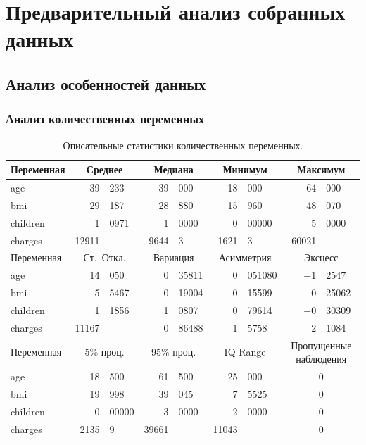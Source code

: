 \documentclass[a4paper,12pt]{article}
\begin{document}
\section{Предварительный анализ собранных данных}
\subsection{Анализ особенностей данных}
\subsubsection{Анализ количественных переменных}

\begin{table}[H]
	\begin{center}
		\begin{tabular}{|l|r@{,}l|r@{,}l|r@{,}l|r@{,}l|}
			\hline
			Переменная & \multicolumn{2}{c|}{Среднее}
			& \multicolumn{2}{c|}{Медиана}
			& \multicolumn{2}{c|}{Минимум}
			& \multicolumn{2}{c|}{Максимум} \\[1ex]
			\hline
			age & 39&233 & 39&000 & 18&000 & 64&000\\
			bmi & 29&187 & 28&880 & 15&960 & 48&070\\
			children & 1&0971 & 1&0000 & 0&00000 & 5&0000\\
			charges & 12911& & 9644&3 & 1621&3 & 60021&\\[10pt]
			
			\hline
			Переменная &  \multicolumn{2}{c}{Ст.\ Откл.}
			& \multicolumn{2}{c|}{Вариация}
			& \multicolumn{2}{c|}{Асимметрия}
			& \multicolumn{2}{c|}{Эксцесс} \\[1ex]
			\hline
			age & 14&050 & 0&35811 & 0&051080 & $-$1&2547\\
			bmi & 5&5467 & 0&19004 & 0&15599 & $-$0&25062\\
			children & 1&1856 & 1&0807 & 0&79614 & $-$0&30309\\
			charges & 11167& & 0&86488 & 1&5758 & 2&1084\\[10pt]
			
			\hline
			Переменная &  \multicolumn{2}{c|}{5\% проц.}
			& \multicolumn{2}{c|}{95\% проц.}
			& \multicolumn{2}{c|}{IQ Range}
			& \multicolumn{2}{c|}{Пропущенные наблюдения} \\[1ex]
			\hline
			age & 18&500 & 61&500 & 25&000 & \multicolumn{2}{c|}{0}\\
			bmi & 19&998 & 39&045 & 7&5525 & \multicolumn{2}{c|}{0}\\
			children & 0&00000 & 3&0000 & 2&0000 & \multicolumn{2}{c|}{0}\\
			charges & 2135&9 & 39661& & 11043& & \multicolumn{2}{c|}{0}\\
			\hline
		\end{tabular}
	\end{center}
	\caption{Описательные статистики количественных переменных.}
	\label{tab:table2}
\end{table}
\end{document}

